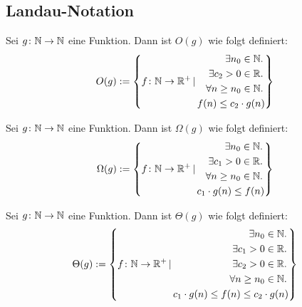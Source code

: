 \subsection{Landau-Notation}

\begin{definition}
	Sei $g \colon \mathbb{N} \rightarrow \mathbb{N}$ eine Funktion. Dann ist $O(g)$
	wie folgt definiert:
	\begin{equation}
		O(g) := 
		\left\{
			f \colon \mathbb{N} \rightarrow \mathbb{R}^+ \,|\,
			\begin{aligned}
				\exists n_0 \in \mathbb{N}.\, \\
				\exists c_2 > 0 \in \mathbb{R}.\, \\
				\forall n \geq n_0 \in \mathbb{N}.\, \\
				f(n) \leq c_2 \cdot g(n) \\
			\end{aligned}
		\right\}
	\end{equation}
\end{definition}

\begin{definition}
	Sei $g \colon \mathbb{N} \rightarrow \mathbb{N}$ eine Funktion. Dann ist $\Omega(g)$
	wie folgt definiert:
	\begin{equation}
		\Omega(g) := 
		\left\{
			f \colon \mathbb{N} \rightarrow \mathbb{R}^+ \,|\, 
			\begin{aligned}
			\exists n_0 \in \mathbb{N}.\, \\
			\exists c_1 > 0 \in \mathbb{R}.\, \\
			\forall n \geq n_0 \in \mathbb{N}.\, \\
			c_1 \cdot g(n) \leq f(n) \\
			\end{aligned}
		\right\}
	\end{equation}
\end{definition}

\begin{definition}
	Sei $g \colon \mathbb{N} \rightarrow \mathbb{N}$ eine Funktion. Dann ist $\Theta(g)$
	wie folgt definiert:
	\begin{equation}
		\Theta(g) := 
		\left\{
			f \colon \mathbb{N} \rightarrow \mathbb{R}^+ \,|\, 
			\begin{aligned}
			\exists n_0 \in \mathbb{N}.\, \\
			\exists c_1 > 0 \in \mathbb{R}.\, \\
			\exists c_2 > 0 \in \mathbb{R}.\, \\
			\forall n \geq n_0 \in \mathbb{N}.\, \\
			c_1 \cdot g(n) \leq f(n) \leq c_2 \cdot g(n) \\
			\end{aligned}
		\right\}
	\end{equation}
\end{definition}

